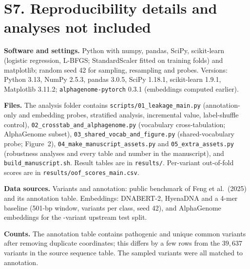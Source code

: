 \documentclass[11pt]{article}
\begin{document}
\begin{table}[h]
\centering\small

\caption{Does the reference-only embedding score add information beyond annotation (consequence terms plus substitution type)? Gain is the paired-bootstrap difference in AUROC between the combined model and annotation alone. The gains are statistically distinguishable from zero for DNABERT-2 and HyenaDNA but small.}
\end{table}

\begin{table}[h]
\centering\small

\caption{The twenty most frequent consequence terms (counts of variants carrying the term) in the full annotation table. A variant can carry several terms.}
\end{table}

\section*{S7. Reproducibility details and analyses not included}
\textbf{Software and settings.} Python with numpy, pandas, SciPy, scikit-learn (logistic regression, L-BFGS; StandardScaler fitted on training folds) and matplotlib; random seed 42 for sampling, resampling and probes. Versions: Python 3.13, NumPy 2.5.3, pandas 3.0.5, SciPy 1.18.1, scikit-learn 1.9.1, Matplotlib 3.11.2; \texttt{alphagenome-pytorch} 0.3.1 (embeddings computed earlier).

\textbf{Files.} The analysis folder contains \texttt{scripts/01\_leakage\_main.py} (annotation-only and embedding probes, stratified analysis, incremental value, label-shuffle control), \texttt{02\_crosstab\_and\_alphagenome.py} (vocabulary cross-tabulation; AlphaGenome subset), \texttt{03\_shared\_vocab\_and\_figure.py} (shared-vocabulary probe; Figure~2), \texttt{04\_make\_manuscript\_assets.py} and \texttt{05\_extra\_assets.py} (robustness analyses and every table and number in the manuscript), and \texttt{build\_manuscript.sh}. Result tables are in \texttt{results/}. Per-variant out-of-fold scores are in \texttt{results/oof\_scores\_main.csv}.

\textbf{Data sources.} Variants and annotation: public benchmark of Feng et al.\ (2025) and its annotation table. Embeddings: DNABERT-2, HyenaDNA and a 4-mer baseline (501-bp window, \NPerClass{} variants per class, seed 42), and AlphaGenome embeddings for the \AgN{}-variant upstream test split.

\textbf{Counts.} The annotation table contains \TabNPath{} pathogenic and \TabNCommon{} unique common variants after removing duplicate coordinates; this differs by a few rows from the \(39{,}637\) variants in the source sequence table. The sampled \NSample{} variants were all matched to annotation.
\end{document}
